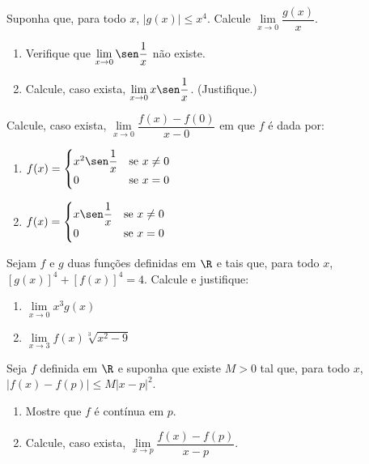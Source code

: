 \begin{exercicio}[3]
Suponha que, para todo $x$, $|g(x)| \le x^4$. Calcule $\lim\limits_{x \to 0} \dfrac{g(x)}{x}$.
\end{exercicio}

\begin{exercicio}[4]
\begin{enumerate}[label=\alph*)]
    \item Verifique que $\lim\limits_{x \to 0} \sen\dfrac{1}{x}$ não existe.
    \item Calcule, caso exista, $\lim\limits_{x \to 0} x\sen\dfrac{1}{x}$. (Justifique.)
\end{enumerate}
\end{exercicio}

\begin{exercicio}[5]
Calcule, caso exista, $\lim\limits_{x \to 0} \dfrac{f(x) - f(0)}{x - 0}$ em que $f$ é dada por:
\begin{enumerate}[label=\alph*)]
    \item $f(x) = \begin{cases} x^2 \sen\dfrac{1}{x} & \text{se } x \neq 0 \\ 0 & \text{se } x = 0 \end{cases}$
    \item $f(x) = \begin{cases} x \sen\dfrac{1}{x} & \text{se } x \neq 0 \\ 0 & \text{se } x = 0 \end{cases}$
\end{enumerate}
\end{exercicio}

\begin{exercicio}[6]
Sejam $f$ e $g$ duas funções definidas em $\R$ e tais que, para todo $x$, $[g(x)]^4 + [f(x)]^4 = 4$. Calcule e justifique:
\begin{enumerate}[label=\alph*)]
    \item $\lim\limits_{x \to 0} x^3 g(x)$
    \item $\lim\limits_{x \to 3} f(x)\sqrt[3]{x^2 - 9}$
\end{enumerate}
\end{exercicio}

\begin{exercicio}[7]
Seja $f$ definida em $\R$ e suponha que existe $M > 0$ tal que, para todo $x$, $|f(x) - f(p)| \le M|x - p|^2$.
\begin{enumerate}[label=\alph*)]
    \item Mostre que $f$ é contínua em $p$.
    \item Calcule, caso exista, $\lim\limits_{x \to p} \dfrac{f(x) - f(p)}{x - p}$.
\end{enumerate}
\end{exercicio}

